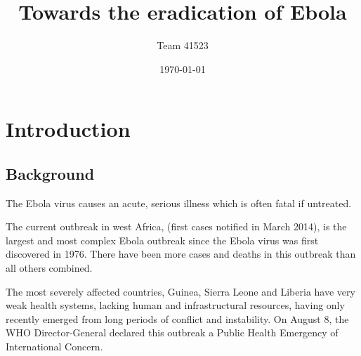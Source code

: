 \documentclass[11pt]{article}
\title{Towards the eradication of Ebola}
\author{Team 41523}
\date{\today}
\begin{document}
	\maketitle
	



\newpage


\tableofcontents

\newpage





\section{Introduction}
\subsection{Background}




The Ebola virus causes an acute, serious illness which is often fatal if untreated. 

The current outbreak in west Africa, (first cases notified in March 2014), is the largest and most complex Ebola outbreak since the Ebola virus was first discovered in 1976. There have been more cases and deaths in this outbreak than all others combined. 

The most severely affected countries, Guinea, Sierra Leone and Liberia have very weak health systems, lacking human and infrastructural resources, having only recently emerged from long periods of conflict and instability. On August 8, the WHO Director-General declared this outbreak a Public Health Emergency of International Concern.
\end{document}
